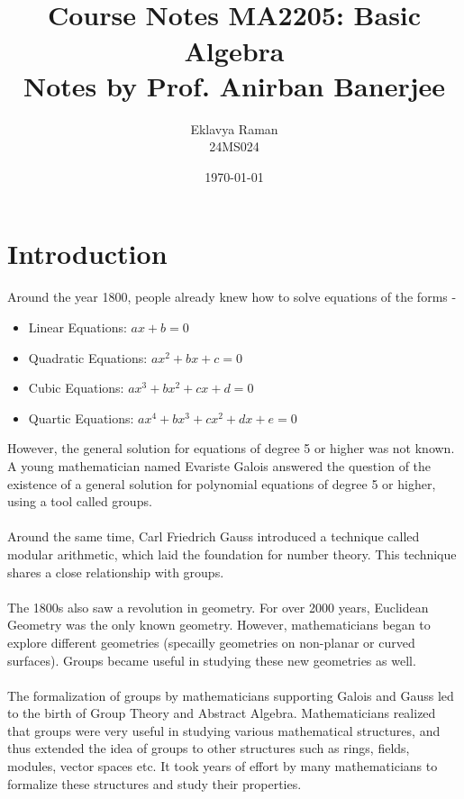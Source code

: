 \documentclass[openany]{book}
\begin{document}
\title{\Large{} \\ \vspace{5pt}
\large{Course Notes MA2205: Basic Algebra \\ \vspace{5pt} Notes by Prof. Anirban Banerjee}}
\author{Eklavya Raman \\ \vspace{5pt} 24MS024} 
\date{\today}
\maketitle
\tableofcontents
\chapter*{Introduction}
    Around the year 1800, people already knew how to solve equations of the forms - 
    \begin{itemize}
        \item Linear Equations: \( ax + b = 0 \)
        \item Quadratic Equations: \( ax^2 + bx + c = 0 \)
        \item Cubic Equations: \( ax^3 + bx^2 + cx + d = 0 \)
        \item Quartic Equations: \( ax^4 + bx^3 + cx^2 + dx + e = 0 \)
    \end{itemize}
    However, the general solution for equations of degree 5 or higher was not known. A young mathematician named Evariste Galois answered the question of the existence of a general solution for polynomial equations of degree 5 or higher, using a tool called groups. \\\\
    Around the same time, Carl Friedrich Gauss introduced a technique called modular arithmetic, which laid the foundation for number theory. This technique shares a close relationship with groups. \\\\
    The 1800s also saw a revolution in geometry. For over 2000 years, Euclidean Geometry was the only known geometry. However, mathematicians began to explore different geometries (specailly geometries on non-planar or curved surfaces). Groups became useful in studying these new geometries as well. \\\\
    The formalization of groups by mathematicians supporting Galois and Gauss led to the birth of Group Theory and Abstract Algebra. Mathematicians realized that groups were very useful in studying various mathematical structures, and thus extended the idea of groups to other structures such as rings, fields, modules, vector spaces etc. It took years of effort by many mathematicians to formalize these structures and study their properties. \\\\
\end{document}
